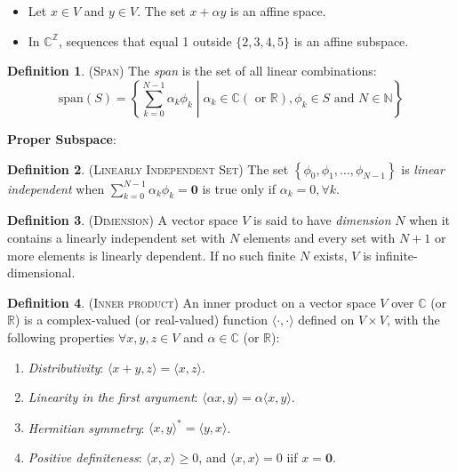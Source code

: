 \documentclass[9pt, twocolumn]{extarticle}
\theoremstyle{definition}
\newtheorem{definition}{Definition}
\begin{document}
\begin{itemize}
  \item Let $ x\in V $ and $ y\in V $. The set $x+\alpha y$ is an affine space.
  \item In $ \mathds{C}^\mathds{Z} $, sequences that equal 1 outside $ \{2, 3, 4, 5\}$ is an affine subspace.
\end{itemize}

\begin{definition}{(\textsc{Span})}
  The \emph{span} is the set of all linear combinations: $$\text{span}(S)=\left\{\sum_{k=0}^{N-1}\alpha_k\phi_k\middle|\alpha_k\in \mathds{C} (\text{ or } \mathds{R}), \phi_k \in S \text{ and } N \in \mathds{N} \right\}$$
\end{definition}

\noindent\textbf{Proper Subspace}: 

\begin{definition}{(\textsc{Linearly Independent Set})}
  The set $ \left\{\phi_0, \phi_1, \dots,\phi_{N-1}\right\} $ is \emph{linear independent} when $\sum_{k=0}^{N-1}\alpha_k\phi_k=\textbf{0}$ is true only if $\alpha_k=0, \forall k$.
\end{definition}
\begin{definition}{(\textsc{Dimension})}
  A vector space $ V $ is said to have \emph{dimension} $ N $ when it contains a linearly independent set with $ N $ elements and every set with $ N+1 $ or more elements is linearly dependent. If no such finite $ N $ exists, $ V $ is infinite-dimensional.
\end{definition}


\begin{definition}{(\textsc{Inner product})}
  An inner product on a vector space $ V $ over $ \mathds{C} $ (or $ \mathds{R} $) is a complex-valued (or real-valued) function $ \langle\cdot,\cdot\rangle $ defined on $ V\times V $, with the following properties $ \forall x,y,z \in V $ and $ \alpha \in \mathds{C} $ (or $ \mathds{R} $):
  \begin{enumerate}[label=(\roman*)]
    \item \emph{Distributivity}: $ \langle x+y, z\rangle = \langle x,z\rangle $.
    \item \emph{Linearity in the first argument}: $ \langle \alpha x, y\rangle = \alpha\langle x,y\rangle $.
    \item \emph{Hermitian symmetry}: $ \langle x,y\rangle^*= \langle y,x\rangle $.
    \item \emph{Positive definiteness}: $ \langle x,x\rangle \geq 0$, and $ \langle x,x\rangle = 0 $ iif $ x = \textbf{0} $.
  \end{enumerate}
\end{definition}
\end{document}
